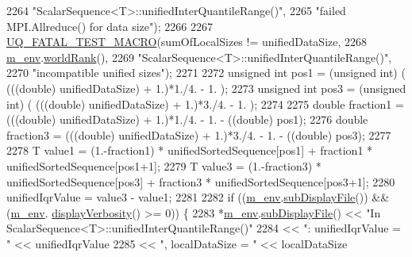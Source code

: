 \begin{DoxyCode}
2264                                    \textcolor{stringliteral}{"ScalarSequence<T>::unifiedInterQuantileRange()"},
2265                                    \textcolor{stringliteral}{"failed MPI.Allreduce() for data size"});
2266 
2267       \hyperlink{_defines_8h_a56d63d18d0a6d45757de47fcc06f574d}{UQ\_FATAL\_TEST\_MACRO}(sumOfLocalSizes != unifiedDataSize,
2268                           \hyperlink{class_q_u_e_s_o_1_1_scalar_sequence_a71618cd6351b29361b437af68447a4c8}{m\_env}.\hyperlink{class_q_u_e_s_o_1_1_base_environment_a78b57112bbd0e6dd0e8afec00b40ffa7}{worldRank}(),
2269                           \textcolor{stringliteral}{"ScalarSequence<T>::unifiedInterQuantileRange()"},
2270                           \textcolor{stringliteral}{"incompatible unified sizes"});
2271 
2272       \textcolor{keywordtype}{unsigned} \textcolor{keywordtype}{int} pos1 = (\textcolor{keywordtype}{unsigned} int) ( (((\textcolor{keywordtype}{double}) unifiedDataSize) + 1.)*1./4. - 1. );
2273       \textcolor{keywordtype}{unsigned} \textcolor{keywordtype}{int} pos3 = (\textcolor{keywordtype}{unsigned} int) ( (((\textcolor{keywordtype}{double}) unifiedDataSize) + 1.)*3./4. - 1. );
2274 
2275       \textcolor{keywordtype}{double} fraction1 = (((double) unifiedDataSize) + 1.)*1./4. - 1. - ((double) pos1);
2276       \textcolor{keywordtype}{double} fraction3 = (((double) unifiedDataSize) + 1.)*3./4. - 1. - ((double) pos3);
2277 
2278       T value1 = (1.-fraction1) * unifiedSortedSequence[pos1] + fraction1 * unifiedSortedSequence[pos1+1];
2279       T value3 = (1.-fraction3) * unifiedSortedSequence[pos3] + fraction3 * unifiedSortedSequence[pos3+1];
2280       unifiedIqrValue = value3 - value1;
2281 
2282       \textcolor{keywordflow}{if} ((\hyperlink{class_q_u_e_s_o_1_1_scalar_sequence_a71618cd6351b29361b437af68447a4c8}{m\_env}.\hyperlink{class_q_u_e_s_o_1_1_base_environment_a8a0064746ae8dddfece4229b9ad374d6}{subDisplayFile}()) && (\hyperlink{class_q_u_e_s_o_1_1_scalar_sequence_a71618cd6351b29361b437af68447a4c8}{m\_env}.
      \hyperlink{class_q_u_e_s_o_1_1_base_environment_a1fe5f244fc0316a0ab3e37463f108b96}{displayVerbosity}() >= 0)) \{
2283         *\hyperlink{class_q_u_e_s_o_1_1_scalar_sequence_a71618cd6351b29361b437af68447a4c8}{m\_env}.\hyperlink{class_q_u_e_s_o_1_1_base_environment_a8a0064746ae8dddfece4229b9ad374d6}{subDisplayFile}() << \textcolor{stringliteral}{"In ScalarSequence<T>::unifiedInterQuantileRange()"}
2284                                 << \textcolor{stringliteral}{": unifiedIqrValue = "} << unifiedIqrValue
2285                                 << \textcolor{stringliteral}{", localDataSize = "}   << localDataSize

\end{DoxyCode}
